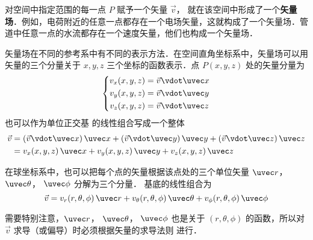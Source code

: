 
对空间中指定范围的每一点 $P$ 赋予一个矢量 $\vec v$， 就在该空间中形成了一个\textbf{矢量场}．例如，电荷附近的任意一点都存在一个电场矢量，这就构成了一个矢量场．管道中任意一点的水流都存在一个速度矢量，他们也构成一个矢量场．

矢量场在不同的参考系中有不同的表示方法．在空间直角坐标系中，矢量场可以用矢量的三个分量关于 $x,y,z$ 三个坐标的函数表示．点 $P(x,y,z)$ 处的矢量分量为
 \begin{equation}
\left\{ \begin{aligned}
{v_x}(x,y,z) &= \vec v \vdot \uvec x\\
{v_y}(x,y,z) &= \vec v \vdot \uvec y\\
{v_z}(x,y,z) &= \vec v \vdot \uvec z
\end{aligned} \right. 
\end{equation}
也可以作为单位正交基 的线性组合写成一个整体
\begin{equation}
\begin{split}
\vec v &= (\vec v \vdot \uvec x)\,\uvec x + (\vec v \vdot \uvec y)\,\uvec y + (\vec v \vdot \uvec z)\,\uvec z\\
 &= {v_x}(x,y,z)\,\uvec x + {v_y}(x,y,z)\,\uvec y + {v_z}(x,y,z)\,\uvec z
\end{split} \end{equation}
 

在球坐标系中，也可以把每个点的矢量根据该点处的三个单位矢量 $\uvec r$，  $\uvec \theta$，  $\uvec \phi$ 分解为三个分量． 基底的线性组合为
\begin{equation}
\vec v = {v_r}(r,\theta ,\phi)\,\uvec r + {v_\theta }(r,\theta ,\phi) \,\uvec\theta  + {v_\phi }(r,\theta ,\phi)\,\uvec \phi  
\end{equation} 

需要特别注意，$\uvec r$，  $\uvec \theta$，  $\uvec \phi$ 也是关于 $(r,\theta ,\phi )$ 的函数，所以对 $\vec v$ 求导（或偏导）时必须根据矢量的求导法则 进行．




